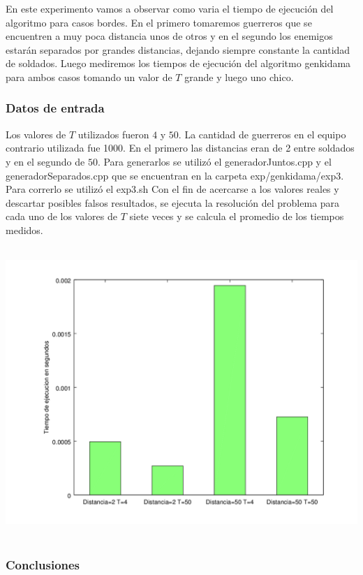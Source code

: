 			En este experimento vamos a observar como varia el tiempo de ejecución del algoritmo para casos bordes. En el primero tomaremos guerreros que se encuentren a muy poca distancia  unos de otros y en el segundo los enemigos estarán separados por grandes distancias, dejando siempre constante la cantidad de soldados. Luego mediremos los tiempos de ejecución del algoritmo genkidama para ambos casos tomando un valor de $T$ grande y luego uno chico.\;

		
		\subsubsection*{Datos de entrada}


			Los valores de $T$ utilizados fueron $4$ y $50$.
			La cantidad de guerreros en el equipo contrario utilizada fue 1000.
			En el primero las distancias eran de 2 entre soldados y en el segundo de $50$.
			Para generarlos se utilizó el generadorJuntos.cpp y el generadorSeparados.cpp  que se encuentran en la carpeta exp/genkidama/exp3.
			Para correrlo se utilizó el exp3.sh 
			Con el fin de acercarse a los valores reales y descartar posibles falsos resultados, se ejecuta la resolución del problema para cada uno de los valores de $T$ siete veces y se calcula el promedio de los tiempos medidos.\;


      	\includegraphics[height=11cm]{graficos/genkidama-exp3.png}


    	\subsubsection*{Conclusiones}\;

